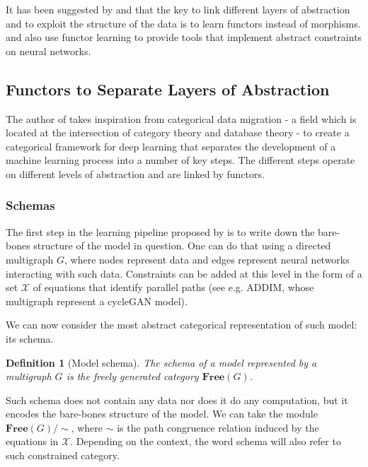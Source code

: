 \documentclass[12pt,a4paper,openright,twoside]{report}
\theoremstyle{plain}
\newtheorem{definition}[proposition]{Definition}
\theoremstyle{definition}
\begin{document}
It has been suggested by \cite{gavranovic2019compositional} and \cite{sheshmani2021categorical} that the key to link different layers of abstraction and to exploit the structure of the data is to learn functors instead of morphisms. \cite{gavranovic2019compositional} and \cite{vaswani2017attention} also use functor learning to provide tools that implement abstract constraints on neural networks.



\subsection{Functors to Separate Layers of Abstraction}

The author of \cite{gavranovic2019compositional} takes inspiration from categorical data migration - a field which is located at the intersection of category theory and database theory - to create a categorical framework for deep learning that separates the development of a machine learning process into a number of key steps. The different steps operate on different levels of abstraction and are linked by functors.

\subsubsection{Schemas}

The first step in the learning pipeline proposed by \cite{gavranovic2019compositional} is to write down the bare-bones structure of the model in question. One can do that using a directed multigraph $G$, where nodes represent data and edges represent neural networks interacting with such data. Constraints can be added at this level in the form of a set $\mathcal{X}$ of equations that identify parallel paths (see e.g. ADDIM, whose multigraph represent a cycleGAN model).


We can now consider the most abstract categorical representation of such model: its schema. 

\begin{definition}[Model schema]
  The schema of a model represented by a multigraph $G$ is the freely generated category $\mathbf{Free}(G)$.
\end{definition}

Such schema does not contain any data nor does it do any computation, but it encodes the bare-bones structure of the model. We can take the module $\mathbf{Free}(G)/{\sim}$, where ${\sim}$ is the path congruence relation induced by the equations in $\mathcal{X}$. Depending on the context, the word schema will also refer to such constrained category.
\end{document}
